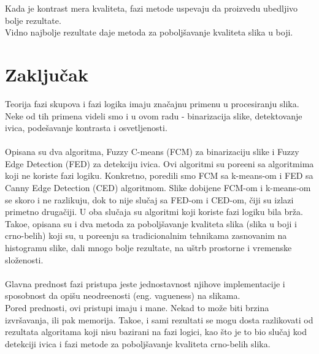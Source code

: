 \documentclass[12pt,a4paper]{article}
\theoremstyle{definition}
\theoremstyle{remark}
\theoremstyle{plain}
\begin{document}
Kada je kontrast mera kvaliteta, fazi metode uspevaju da proizvedu ubedljivo bolje rezultate. \\
Vidno najbolje rezultate daje metoda za pobolj\v savanje kvaliteta slika u boji. 

\section{Zaklju\v cak}
Teorija fazi skupova i fazi logika imaju zna\v cajnu primenu u procesiranju slika. Neke od tih primena videli smo i u ovom radu - binarizacija slike, detektovanje ivica, pode\v savanje kontrasta i osvetljenosti. \\ \\
Opisana su dva algoritma, Fuzzy C-means (FCM) za binarizaciju slike i Fuzzy Edge Detection (FED) za detekciju ivica. Ovi algoritmi su pore\dj eni sa algoritmima koji ne koriste fazi logiku. Konkretno, poredili smo FCM sa k-means-om i FED sa Canny Edge Detection (CED) algoritmom. Slike dobijene FCM-om i k-means-om se skoro i ne razlikuju, dok to nije slu\v caj sa FED-om i CED-om, \v ciji su izlazi primetno druga\v ciji. U oba slu\v caja su algoritmi koji koriste fazi logiku bila br\v za.
\\
Tako\dj e, opisana su i dva metoda za pobolj\v savanje kvaliteta slika (slika u boji i crno-belih) koji su, u pore\dj enju sa tradicionalnim tehnikama zasnovanim na histogramu slike, dali mnogo bolje rezultate, na u\v strb prostorne i vremenske slo\v zenosti. \\ 
\\
Glavna prednost fazi pristupa jeste jednostavnost njihove implementacije i sposobnost da opi\v su neodre\dj enosti (eng. vagueness) na slikama. \\ Pored prednosti, ovi pristupi imaju i mane. Nekad to mo\v ze biti brzina izvr\v savanja, ili pak memorija. Tako\dj e, i sami rezultati se mogu dosta razlikovati od rezultata algoritama koji nisu bazirani na fazi logici, kao \v sto je to bio slu\v caj kod detekciji ivica i fazi metode za pobolj\v savanje kvaliteta crno-belih slika.

\newpage
\end{document}
